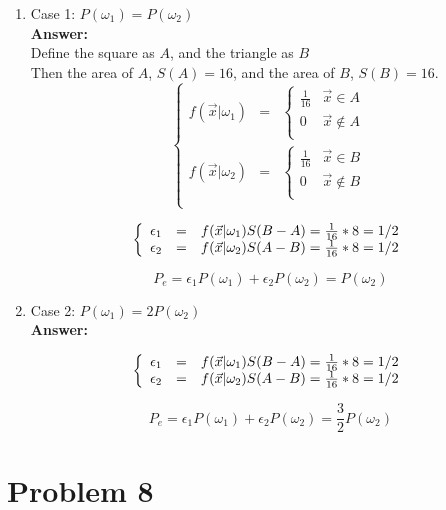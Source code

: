 \documentclass[letterpaper,11pt]{article}
\begin{document}
\begin{enumerate}
\item Case 1: $P(\omega_1)=P(\omega_2)$\\
\textbf{Answer:}\\
Define the square as $A$, and the triangle as $B$\\
Then the area of $A$, $S(A)=16$, and the area of $B$, $S(B)=16$.
$$\left\{\begin{array}{rcl}
f(\vec{x}|\omega_1) & = & \left\{\begin{array}{cc}
\frac{1}{16} & \vec{x} \in A\\
0 & \vec{x} \not \in A\\
\end{array}\right. \\
f(\vec{x}|\omega_2) & = & \left\{\begin{array}{cc}
\frac{1}{16} & \vec{x} \in B\\
0 & \vec{x} \not \in B\\
\end{array}\right. \\
\end{array}\right.$$

$$\left\{\begin{array}{rcl}
\epsilon_1 & = & f(\vec{x}|\omega_1)S(B-A)=\frac{1}{16}*8=1/2 \\
\epsilon_2 & = & f(\vec{x}|\omega_2)S(A-B)=\frac{1}{16}*8=1/2 \\
\end{array}\\
\right.$$

$$P_e=\epsilon_1 P(\omega_1)+\epsilon_2 P(\omega_2)=P(\omega_2)$$
\item Case 2: $P(\omega_1)=2P(\omega_2)$\\
\textbf{Answer:}

$$\left\{\begin{array}{rcl}
\epsilon_1 & = & f(\vec{x}|\omega_1)S(B-A)=\frac{1}{16}*8=1/2 \\
\epsilon_2 & = & f(\vec{x}|\omega_2)S(A-B)=\frac{1}{16}*8=1/2 \\
\end{array}\\
\right.$$

$$P_e=\epsilon_1 P(\omega_1)+\epsilon_2 P(\omega_2)=\frac{3}{2}P(\omega_2)$$

\end{enumerate}

\newpage

\section*{Problem 8}
\end{document}
